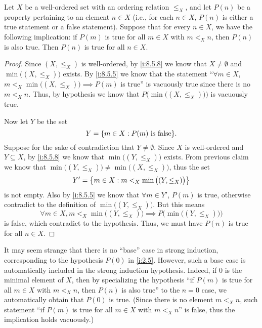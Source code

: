 \begin{prop}\label{i:8.5.10}
  Let \(X\) be a well-ordered set with an ordering relation \(\leq_X\), and let \(P(n)\) be a property pertaining to an element \(n \in X\)
  (i.e., for each \(n \in X\), \(P(n)\) is either a true statement or a false statement).
  Suppose that for every \(n \in X\), we have the following implication:
  if \(P(m)\) is true for all \(m \in X\) with \(m <_X n\), then \(P(n)\) is also true.
  Then \(P(n)\) is true for all \(n \in X\).
\end{prop}

\begin{proof}
  Since \((X, \leq_X)\) is well-ordered, by \cref{i:8.5.8} we know that \(X \neq \emptyset\) and \(\min\big((X, \leq_X)\big)\) exists.
  By \cref{i:8.5.5} we know that the statement ``\(\forall m \in X\), \(m <_X \min\big((X, \leq_X)\big) \implies P(m)\) is true'' is vacuously true since there is no \(m <_X n\).
  Thus, by hypothesis we know that \(P\Big(\min\big((X, \leq_X)\big)\Big)\) is vacuously true.

  Now let \(Y\) be the set
  \[
    Y = \set{m \in X : P(m) \text{ is false}}.
  \]
  Suppose for the sake of contradiction that \(Y \neq \emptyset\).
  Since \(X\) is well-ordered and \(Y \subseteq X\), by \cref{i:8.5.8} we know that \(\min\big((Y, \leq_X)\big)\) exists.
  From previous claim we know that \(\min\big((Y, \leq_X)\big) \neq \min\big((X, \leq_X)\big)\), thus the set
  \[
    Y' = \left\lbrace m \in X : m <_X \min\big((Y, \leq_X)\big)\right\rbrace
  \]
  is not empty.
  Also by \cref{i:8.5.5} we know that \(\forall m \in Y'\), \(P(m)\) is true, otherwise contradict to the definition of \(\min\big((Y, \leq_X)\big)\).
  But this means
  \[
    \forall m \in X, m <_X \min\big((Y, \leq_X)\big) \implies P\Big(\min\big((Y, \leq_X)\big)\Big)
  \]
  is false, which contradict to the hypothesis.
  Thus, we must have \(P(n)\) is true for all \(n \in X\).
\end{proof}

\begin{rmk}\label{i:8.5.11}
  It may seem strange that there is no ``base'' case in strong induction, corresponding to the hypothesis \(P(0)\) in \cref{i:2.5}.
  However, such a base case is automatically included in the strong induction hypothesis.
  Indeed, if \(0\) is the minimal element of \(X\), then by specializing the hypothesis ``if \(P(m)\) is true for all \(m \in X\) with \(m <_X n\), then \(P(n)\) is also true'' to the \(n = 0\) case, we automatically obtain that \(P(0)\) is true.
  (Since there is no element \(m <_X n\), such statement ``if \(P(m)\) is true for all \(m \in X\) with \(m <_X n\)'' is false, thus the implication holds vacuously.)
\end{rmk}

